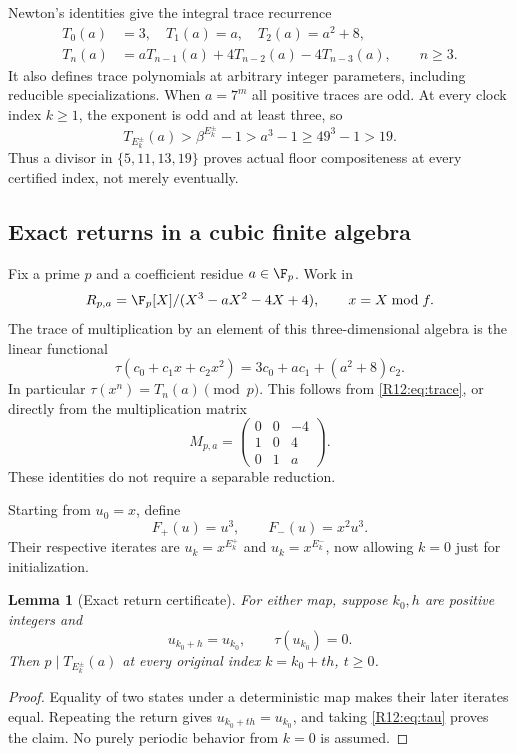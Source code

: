 \documentclass[11pt,a4paper]{article}
\newtheorem{lemma}[theorem]{Lemma}\newtheorem{proposition}[theorem]{Proposition}
\theoremstyle{definition}\newtheorem{definition}[theorem]{Definition}
\theoremstyle{remark}\newtheorem{remark}[theorem]{Remark}
\begin{document}
Newton's identities give the integral trace recurrence
\begin{equation}\label{R12:eq:trace}
\begin{split}
 T_0(a)&=3,\quad T_1(a)=a,\quad T_2(a)=a^2+8,\\
 T_n(a)&=aT_{n-1}(a)+4T_{n-2}(a)-4T_{n-3}(a),\qquad n\ge3.
\end{split}
\end{equation}
It also defines trace polynomials at arbitrary integer parameters,
including reducible specializations. When $a=7^m$ all positive traces
are odd. At every clock index $k\ge1$, the exponent is odd and at
least three, so
\begin{equation}\label{R12:eq:large}
 T_{E_k^\pm}(a)>\beta^{E_k^\pm}-1>a^3-1
 \ge49^3-1>19.
\end{equation}
Thus a divisor in $\{5,11,13,19\}$ proves actual floor compositeness
at every certified index, not merely eventually.

\subsection{Exact returns in a cubic finite algebra}

Fix a prime $p$ and a coefficient residue $a\in\F_p$. Work in
\[
 R_{p,a}=\F_p[X]/(X^3-aX^2-4X+4),\qquad x=X\bmod f.
\]
The trace of multiplication by an element of this three-dimensional
algebra is the linear functional
\begin{equation}\label{R12:eq:tau}
 \tau(c_0+c_1x+c_2x^2)=3c_0+ac_1+(a^2+8)c_2.
\end{equation}
In particular $\tau(x^n)=T_n(a)\pmod p$. This follows from
\eqref{R12:eq:trace}, or directly from the multiplication matrix
\begin{equation}\label{R12:eq:matrix}
 M_{p,a}=\begin{pmatrix}0&0&-4\\1&0&4\\0&1&a\end{pmatrix}.
\end{equation}
These identities do not require a separable reduction.

Starting from $u_0=x$, define
\[
 F_+(u)=u^3,\qquad F_-(u)=x^2u^3.
\]
Their respective iterates are $u_k=x^{E_k^+}$ and $u_k=x^{E_k^-}$,
now allowing $k=0$ just for initialization.

\begin{lemma}[Exact return certificate]\label{R12:lem:return}
For either map, suppose $k_0,h$ are positive integers and
\[
 u_{k_0+h}=u_{k_0},\qquad \tau(u_{k_0})=0.
\]
Then $p\mid T_{E_k^\pm}(a)$ at every original index
$k=k_0+th$, $t\ge0$.
\end{lemma}
\begin{proof}
Equality of two states under a deterministic map makes their later
iterates equal. Repeating the return gives
$u_{k_0+th}=u_{k_0}$, and taking \eqref{R12:eq:tau} proves the claim.
No purely periodic behavior from $k=0$ is assumed.
\end{proof}
\end{document}
